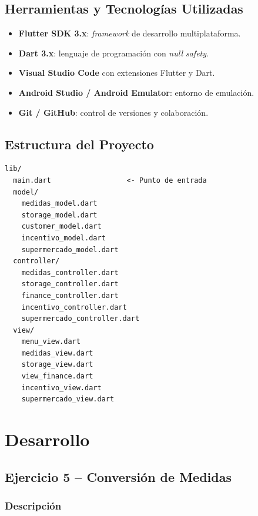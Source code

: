 \documentclass[12pt,a4paper]{article}
\begin{document}
\subsection{Herramientas y Tecnologías Utilizadas}

\begin{itemize}
  \item \textbf{Flutter SDK 3.x}: \textit{framework} de desarrollo multiplataforma.
  \item \textbf{Dart 3.x}: lenguaje de programación con \textit{null safety}.
  \item \textbf{Visual Studio Code} con extensiones Flutter y Dart.
  \item \textbf{Android Studio / Android Emulator}: entorno de emulación.
  \item \textbf{Git / GitHub}: control de versiones y colaboración.
\end{itemize}

\subsection{Estructura del Proyecto}

\begin{verbatim}
lib/
  main.dart                  <- Punto de entrada
  model/
    medidas_model.dart
    storage_model.dart
    customer_model.dart
    incentivo_model.dart
    supermercado_model.dart
  controller/
    medidas_controller.dart
    storage_controller.dart
    finance_controller.dart
    incentivo_controller.dart
    supermercado_controller.dart
  view/
    menu_view.dart
    medidas_view.dart
    storage_view.dart
    view_finance.dart
    incentivo_view.dart
    supermercado_view.dart
\end{verbatim}

\section{Desarrollo}

\subsection{Ejercicio 5 -- Conversión de Medidas}

\subsubsection{Descripción}
\end{document}
